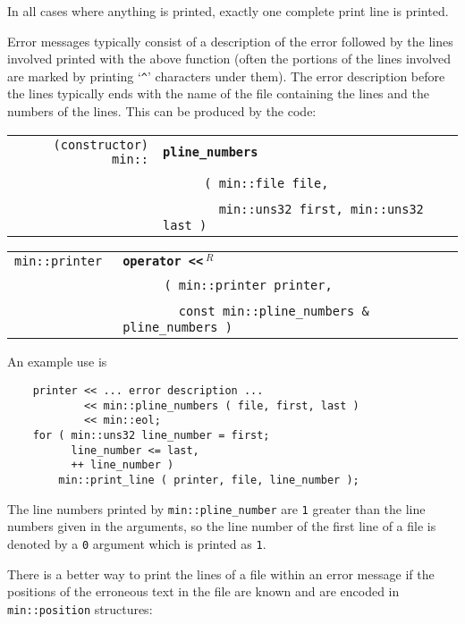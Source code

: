 \documentclass[12pt]{article}
\makeatletter
\newcommand{\ttomkey}[3]{{\tt \bf operator #2}%
                         \index{#1@{\tt operator #2}!{#3}}}
\newcommand{\ttindex}[1]{\index{#1@{\tt #1}}}
\newcommand{\minindex}[1]{\ttindex{min::#1}\ttindex{#1}}
\newcommand{\EOL}{\penalty \exhyphenpenalty}
\newcommand{\LT}{{\tt <}}
\newenvironment{indpar}[1][0.3in]%
	{\begin{list}{}%
		     {\setlength{\itemsep}{0in}%
		      \setlength{\topsep}{0in}%
		      \setlength{\parsep}{1ex}%
		      \setlength{\labelwidth}{#1}%
		      \setlength{\leftmargin}{#1}%
		      \addtolength{\leftmargin}{\labelsep}}%
	 \item}%
	{\end{list}}
\newcommand{\LABEL}[1]{\label{#1}}
\newcommand{\ARGBREAK}{\\&{\tt ~~~~}}
\newcommand{\TTOMKEY}[2]{\ttomkey{#1}{#2}}
\newcommand{\MINKEY}[1]{{\tt \bf #1}\minindex{#1}}
\newcommand{\REL}{$\,^R$}
\makeatother
\begin{document}
In all cases where anything is printed, exactly one complete print line is
printed.

Error messages typically consist of a description of the error
followed by the lines involved printed with the above function
(often the portions of the lines involved are marked by printing
`\verb|^|' characters under them).  The error description before
the lines typically ends with the name of the file containing
the lines and the numbers of the lines.  This can be produced
by the code:

\begin{indpar}[1em]\begin{tabular}{r@{}l}
\verb|(constructor) min::| & \MINKEY{pline\_numbers}\ARGBREAK
    \verb| ( min::file file,|\ARGBREAK
    \verb|   min::uns32 first, min::uns32 last )|
\LABEL{MIN::PLINE_NUMBERS} \\
\end{tabular}\end{indpar}

\begin{indpar}[1em]\begin{tabular}{r@{}l}
\verb|min::printer |
    & \TTOMKEY{<<}{\LT\LT\REL}%
              {of {\tt min::printer}}\ARGBREAK
      \verb| ( min::printer printer,|\ARGBREAK
      \verb|   const min::pline_numbers & pline_numbers )|
\LABEL{PRINTER_OPERATOR<<_OF_PLINE_NUMBERS} \\
\end{tabular}\end{indpar}

An example use is

\begin{indpar}\begin{verbatim}
    printer << ... error description ...
            << min::pline_numbers ( file, first, last )
            << min::eol;
    for ( min::uns32 line_number = first;
          line_number <= last,
          ++ line_number )
        min::print_line ( printer, file, line_number );
\end{verbatim}\end{indpar}

The line numbers printed by {\tt min::\EOL pline\_\EOL number}
are \verb|1| greater than the line numbers given in the arguments,
so the line number of the first line of a file is denoted by a
\verb|0| argument which is printed as \verb|1|.

There is a better way to print the lines of a file within an
error message if the positions of the erroneous text in the file
are known and are encoded in
\verb|min::position| structures:
\end{document}
